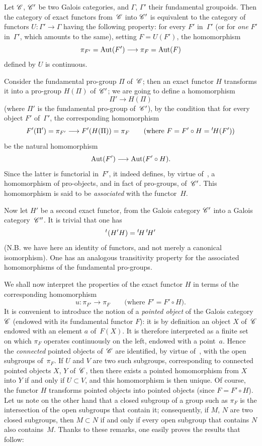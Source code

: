 \begin{corollary}
\label{V.6.3}
Let $\cal{C}$, $\cal{C'}$ be two Galois categories, and
$\Gamma$, $\Gamma'$ their fundamental groupoids. Then the
category of exact functors from~$\cal{C}$ into $\cal{C'}$ is
equivalent to the category of functors $U\colon \Gamma'
\to \Gamma$ having the following property: for every $F'$ in~$\Gamma'$ (or for \emph{one} $F'$ in~$\Gamma'$, which amounts to the
same), setting $F=U(F')$, the homomorphism
$$
\pi_{F'} =\Aut (F')\to \pi_F =\Aut (F)
$$
defined by $U$ is continuous.
\end{corollary}

Consider the fundamental pro-group $\Pi$ of~$\cal{C}$; then an
exact functor $H$ transforms it into a pro-group $H(\Pi)$
of~$\cal{C'}$; we are going to define a homomorphism
$$
\Pi' \to H(\Pi)
$$
(where $\Pi'$ is the fundamental pro-group of~$\cal{C'}$), by the
condition that for every object $F'$ of~$\Gamma'$, the corresponding
homomorphism
$$
F' (\Pi')=\pi_{F'} \to F' (H(\Pi))=\pi_F \qquad
\text{(where $F=F'\circ H=\tH(F')$)}
$$
be the natural homomorphism
$$
\Aut(F')\to \Aut(F' \circ H).
$$
Since the latter is functorial in~$F'$, it indeed defines, by virtue
of~, a homomorphism of pro-objects, and in fact of
pro-groups, of~$\cal{C'}$. This homomorphism is said to be
\emph{associated} with the functor~$H$.

Now let $H'$ be a second exact functor, from the
Galois category $\cal{C'}$ into a
Galois category~$\cal{C''}$. It is trivial that one has
$$
{}^t (H' H)={}^t\!H\,{}^t\!H'
$$
(N.B. we have here an identity of functors, and not merely a
canonical isomorphism). One has an analogous transitivity
property for the associated homomorphisms of the
fundamental pro-groups.

We
shall now interpret the properties of the exact
functor $H$ in terms of the corresponding homomorphism
$$
u\colon \pi_{F'} \to \pi_{F} \qquad \text{(where $F' =F'\circ H$)}.
$$
It is convenient to introduce the notion of a \emph{pointed object}
of the Galois category $\cal{C}$ (endowed with its fundamental
functor $F$): it is by definition an object $X$ of~$\cal{C}$
endowed with an element $a$ of~$F(X)$. It is therefore interpreted
as a finite set on which $\pi_F$ operates continuously on the
left, endowed with a point~$a$. Hence the \emph{connected} pointed
objects of~$\cal{C}$ are identified, by virtue of~, with the
open subgroups of~$\pi_F$. If $U$ and $V$ are two such
subgroups, corresponding to connected pointed objects
$X$, $Y$ of~$\cal{C}$, then there exists a pointed homomorphism from
$X$ into $Y$ if and only if $U\subset V$, and this homomorphism is
then unique. Of course, the functor $H$ transforms pointed
objects into pointed objects (since $F=F' \circ H$). Let us note
on the other hand that a closed subgroup of a group such as $\pi_F$
is the intersection of the open subgroups that contain it;
consequently,
if
$M$, $N$ are two closed subgroups, then $M\subset N$ if and
only if every open subgroup that contains $N$ also
contains~$M$. Thanks to these remarks, one easily proves
the results that follow:

